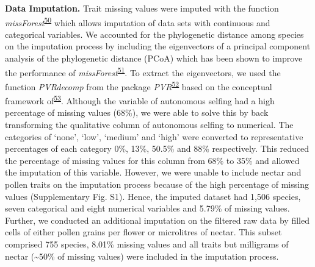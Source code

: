 \documentclass[12pt,a4paper,]{article}
\begin{document}
\endgroup{}

\doublespacing

\textbf{Data Imputation.} Trait missing values were imputed with the
function
\emph{missForest}\textsuperscript{\protect\hyperlink{ref-stekhoven2012}{50}}
which allows imputation of data sets with continuous and categorical
variables. We accounted for the phylogenetic distance among species on
the imputation process by including the eigenvectors of a principal
component analysis of the phylogenetic distance (PCoA) which has been
shown to improve the performance of
\emph{missForest}\textsuperscript{\protect\hyperlink{ref-penone2014}{51}}.
To extract the eigenvectors, we used the function \emph{PVRdecomp} from
the package
\emph{PVR}\textsuperscript{\protect\hyperlink{ref-santos2018}{52}} based
on the conceptual framework
of\textsuperscript{\protect\hyperlink{ref-diniz-filho2012}{53}}.
Although the variable of autonomous selfing had a high percentage of
missing values (68\%), we were able to solve this by back transforming
the qualitative column of autonomous selfing to numerical. The
categories of `none', `low', `medium' and `high' were converted to
representative percentages of each category 0\%, 13\%, 50.5\% and 88\%
respectively. This reduced the percentage of missing values for this
column from 68\% to 35\% and allowed the imputation of this variable.
However, we were unable to include nectar and pollen traits on the
imputation process because of the high percentage of missing values
(Supplementary Fig. S1). Hence, the imputed dataset had 1,506 species,
seven categorical and eight numerical variables and 5.79\% of missing
values. Further, we conducted an additional imputation on the filtered
raw data by filled cells of either pollen grains per flower or
microlitres of nectar. This subset comprised 755 species, 8.01\% missing
values and all traits but milligrams of nectar (\textasciitilde{}50\% of
missing values) were included in the imputation process.
\end{document}
